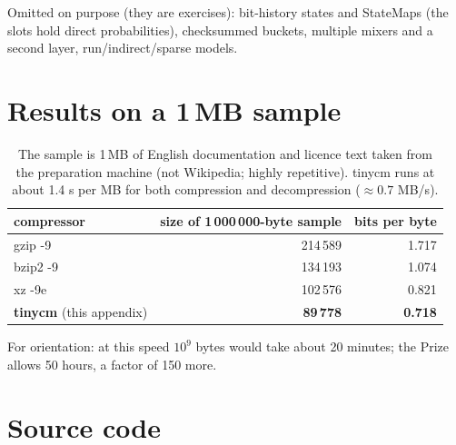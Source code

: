 \documentclass[11pt,a4paper,openany]{book}
\theoremstyle{definition}
\theoremstyle{remark}
\begin{document}
Omitted on purpose (they are exercises): bit-history states and StateMaps (the slots hold direct probabilities), checksummed buckets, multiple mixers and a second layer, run/indirect/sparse models.

\section{Results on a 1\,MB sample}

\begin{table}[h]
\centering
\begin{tabular}{@{}lrr@{}}
\toprule
compressor & size of 1\,000\,000-byte sample & bits per byte\\
\midrule
gzip -9 & 214\,589 & 1.717\\
bzip2 -9 & 134\,193 & 1.074\\
xz -9e & 102\,576 & 0.821\\
\textbf{tinycm} (this appendix) & \textbf{89\,778} & \textbf{0.718}\\
\bottomrule
\end{tabular}
\caption{The sample is 1\,MB of English documentation and licence text taken from the preparation machine (not Wikipedia; highly repetitive). tinycm runs at about 1.4 s per MB for both compression and decompression ($\approx0.7$ MB/s).}
\end{table}

For orientation: at this speed $10^9$ bytes would take about 20 minutes; the Prize allows 50 hours, a factor of 150 more.

\section{Source code}
\end{document}
